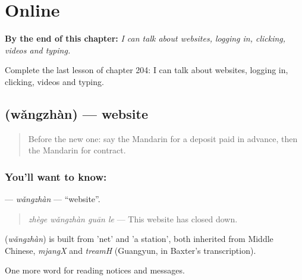 
\chapter{Online}
\label{ch:zh-online}

\begin{chapteropening}
\textbf{By the end of this chapter:} \emph{I can talk about websites, logging in, clicking, videos and typing.}

Complete the last lesson of chapter 204: I can talk about websites, logging in, clicking, videos and typing.
\end{chapteropening}

\section[\texorpdfstring{\zh{网站} (wǎngzhàn)}{网站 (wǎngzhàn)}]{ (wǎngzhàn) — website}

\label{lesson:ZH-C204-wangzhan}



\begin{quote}
Before the new one: say the Mandarin for a deposit paid in advance, then the Mandarin for contract.
\end{quote}

\subsection*{You'll want to know: }
\textbf{} — \emph{wǎngzhàn} — \textquotedblleft{}website\textquotedblright{}.

\begin{quote}
\textbf{} \emph{zhège wǎngzhàn guān le} — This website has closed down.
\end{quote}

\begin{cousinweb}
\textbf{} (\emph{wǎngzhàn}) is built from  'net' and  'a station', both inherited from Middle Chinese, \emph{mjangX} and \emph{treamH} (Guangyun, in Baxter's transcription).
\end{cousinweb}

\begin{grammarlens}[title={What you've built}]
One more word for reading notices and messages.
\end{grammarlens}

